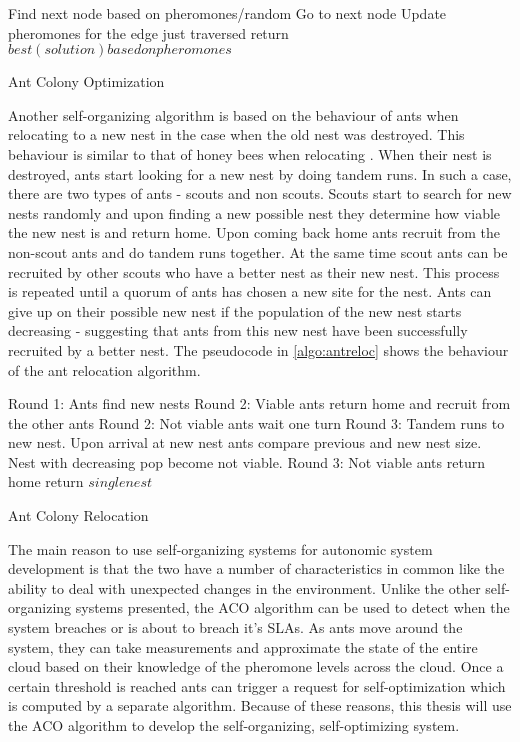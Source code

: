 \begin{algorithm}
\begin{algorithmic}
	\State Find next node based on pheromones/random
	\State Go to next node
	\State Update pheromones for the edge just traversed
\EndWhile
\State return $best(solution) based on pheromones$
\end{algorithmic}
\caption{Ant Colony Optimization}\label{algo:aco}
\end{algorithm}

Another self-organizing algorithm is based on the behaviour of ants when relocating to a new nest in the case when the old nest was destroyed. This behaviour is similar to that of honey bees when relocating \cite{selforg:antreloc}. When their nest is destroyed, ants start looking for a new nest by doing tandem runs. In such a case, there are two types of ants - scouts and non scouts. Scouts start to search for new nests randomly and upon finding a new possible nest they determine how viable the new nest is and return home. Upon coming back home ants recruit from the non-scout ants and do tandem runs together. At the same time scout ants can be recruited by other scouts who have a better nest as their new nest. This process is repeated until a quorum of ants has chosen a new site for the nest. Ants can give up on their possible new nest if the population of the new nest starts decreasing - suggesting that ants from this new nest have been successfully recruited by a better nest. The pseudocode in \ref{algo:antreloc} shows the behaviour of the ant relocation algorithm.

\begin{algorithm}
\begin{algorithmic}
\State Round 1: Ants find new nests
	\State Round 2: Viable ants return home and recruit from the other ants
	\State Round 2: Not viable ants wait one turn
	\State Round 3: Tandem runs to new nest. Upon arrival at new nest ants compare previous and new nest size. Nest with decreasing pop become not viable. 
	\State Round 3: Not viable ants return home
\EndWhile
\State return $single nest$
\end{algorithmic}
\caption{Ant Colony Relocation}\label{algo:antreloc}
\end{algorithm}

The main reason to use self-organizing systems for autonomic system development is that the two have a number of characteristics in common like the ability to deal with unexpected changes in the environment. Unlike the other self-organizing systems presented, the ACO algorithm can be used to detect when the system breaches or is about to breach it's SLAs. As ants move around the system, they can take measurements and approximate the state of the entire cloud based on their knowledge of the pheromone levels across the cloud. Once a certain threshold is reached ants can trigger a request for self-optimization which is computed by a separate algorithm. Because of these reasons, this thesis will use the ACO algorithm to develop the self-organizing, self-optimizing system.

